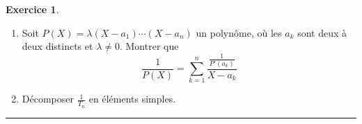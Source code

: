 \documentclass[a4paper,10pt]{article}
\theoremstyle{definition}
\theoremstyle{definition}
\newtheorem{exo}{Exercice}
\begin{document}
\begin{minipage}{1\linewidth}
\begin{minipage}[t]{0.48\linewidth}
\begin{exo}
\begin{enumerate}
		\item Soit $P(X)=\lambda(X-a_1)\cdots(X-a_n)$ un polynôme, où les $a_k$ sont deux à deux distincts 
		et $\lambda\not=0$. Montrer que 
		$$\frac{1}{P(X)}=\sum_{k=1}^n\frac{\frac{1}{P'(a_k)}}{X-a_k}$$
		
		\item Décomposer $\frac{1}{T_n}$ en éléments simples.
	\end{enumerate}
	\centering
	\rule{1\linewidth}{0.6pt}
\end{exo}
	

		
		
		
		
	\end{minipage}
\end{minipage}	
\end{document}
